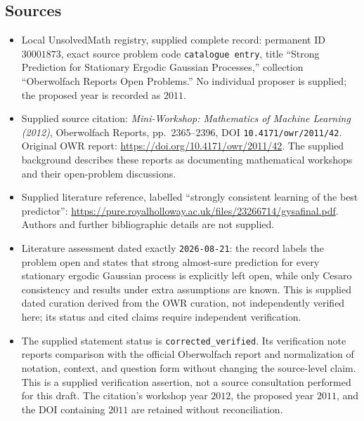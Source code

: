 \documentclass[11pt]{article}
\begin{document}
\subsection{Sources}
\begin{itemize}
\item Local UnsolvedMath registry, supplied complete record: permanent ID \(30001873\), exact source problem code \texttt{catalogue entry}, title ``Strong Prediction for Stationary Ergodic Gaussian Processes,'' collection ``Oberwolfach Reports Open Problems.'' No individual proposer is supplied; the proposed year is recorded as \(2011\).
\item Supplied source citation: \emph{Mini-Workshop: Mathematics of Machine Learning (2012)}, Oberwolfach Reports, pp.\ 2365--2396, DOI \texttt{10.4171/owr/2011/42}. Original OWR report: \url{https://doi.org/10.4171/owr/2011/42}. The supplied background describes these reports as documenting mathematical workshops and their open-problem discussions.
\item Supplied literature reference, labelled ``strongly consistent learning of the best predictor'': \url{https://pure.royalholloway.ac.uk/files/23266714/gysafinal.pdf}. Authors and further bibliographic details are not supplied.
\item Literature assessment dated exactly \texttt{2026-08-21}: the record labels the problem open and states that strong almost-sure prediction for every stationary ergodic Gaussian process is explicitly left open, while only Cesaro consistency and results under extra assumptions are known. This is supplied dated curation derived from the OWR curation, not independently verified here; its status and cited claims require independent verification.
\item The supplied statement status is \texttt{corrected\_verified}. Its verification note reports comparison with the official Oberwolfach report and normalization of notation, context, and question form without changing the source-level claim. This is a supplied verification assertion, not a source consultation performed for this draft. The citation's workshop year \(2012\), the proposed year \(2011\), and the DOI containing \(2011\) are retained without reconciliation.
\end{itemize}
\end{document}
